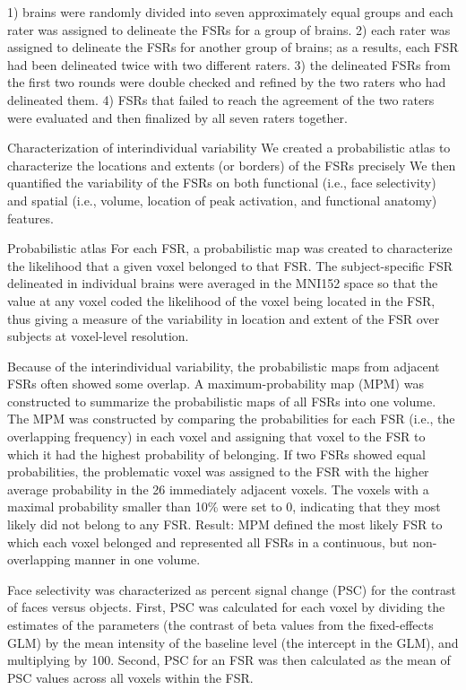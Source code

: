 %
1) brains were randomly divided into seven approximately equal groups and each
rater was assigned to delineate the FSRs for a group of brains.
%
2) each rater was assigned to delineate the FSRs for another group of brains;
%
as a results, each FSR had been delineated twice with two different raters.
%
3) the delineated FSRs from the first two rounds were double checked and refined
by the two raters who had delineated them.
%
4) FSRs that failed to reach the agreement of the two raters were evaluated and
then finalized by all seven raters together.


Characterization of interindividual variability
%
We created a probabilistic atlas to characterize the locations and extents (or
borders) of the FSRs precisely
%
We then quantified the variability of the FSRs on both functional (i.e., face
selectivity) and spatial (i.e., volume, location of peak activation, and
functional anatomy) features.

Probabilistic atlas
%
For each FSR, a probabilistic map was created to characterize the likelihood
that a given voxel belonged to that FSR.
%
The subject-specific FSR delineated in individual brains were averaged in the
MNI152 space so that the value at any voxel coded the likelihood of the voxel
being located in the FSR, thus giving a measure of the variability in location
and extent of the FSR over subjects at voxel-level resolution.

%
Because of the interindividual variability, the probabilistic maps from adjacent
FSRs often showed some overlap.
%
A maximum-probability map (MPM) was constructed to summarize the probabilistic
maps of all FSRs into one volume.
%
The MPM was constructed by comparing the probabilities for each FSR (i.e., the
overlapping frequency) in each voxel and assigning that voxel to the FSR to
which it had the highest probability of belonging.
%
If two FSRs showed equal probabilities, the problematic voxel was assigned to
the FSR with the higher average probability in the 26 immediately adjacent
voxels.
%
The voxels with a maximal probability smaller than 10\% were set to 0,
indicating that they most likely did not belong to any FSR.
%
Result: MPM defined the most likely FSR to which each voxel belonged and
represented all FSRs in a continuous, but non-overlapping manner in one volume.

%
Face selectivity was characterized as percent signal change (PSC) for the
contrast of faces versus objects.
%
First, PSC was calculated for each voxel by dividing the estimates of the
parameters (the contrast of beta values from the fixed-effects GLM) by the mean
intensity of the baseline level (the intercept in the GLM), and multiplying by
100.
%
Second, PSC for an FSR was then calculated as the mean of PSC values across all
voxels within the FSR.

